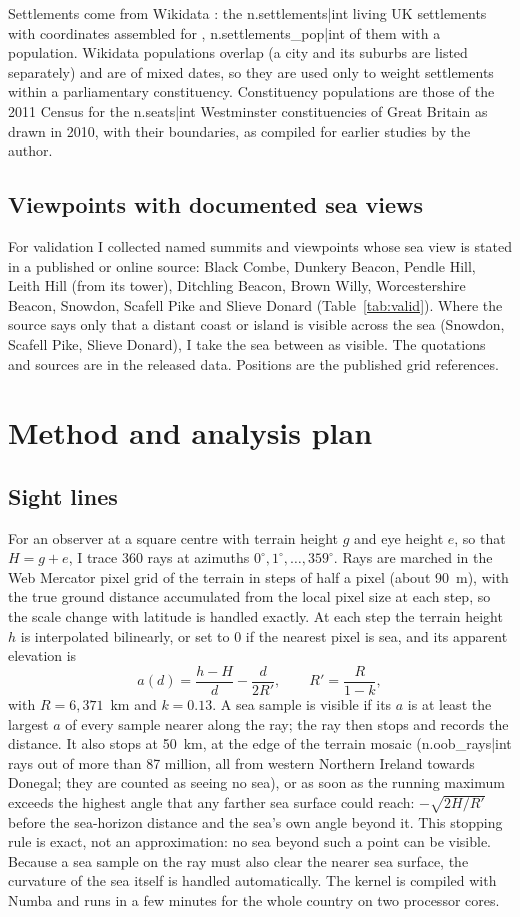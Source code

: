 Settlements come from Wikidata \citep{wikidata}: the {{n.settlements|int}} living UK settlements with coordinates assembled for \citet{hotham2026sunless}, {{n.settlements_pop|int}} of them with a population. Wikidata populations overlap (a city and its suburbs are listed separately) and are of mixed dates, so they are used only to weight settlements within a parliamentary constituency. Constituency populations are those of the 2011 Census for the {{n.seats|int}} Westminster constituencies of Great Britain as drawn in 2010, with their boundaries, as compiled for earlier studies by the author.

\subsection{Viewpoints with documented sea views}
For validation I collected named summits and viewpoints whose sea view is stated in a published or online source: Black Combe, Dunkery Beacon, Pendle Hill, Leith Hill (from its tower), Ditchling Beacon, Brown Willy, Worcestershire Beacon, Snowdon, Scafell Pike and Slieve Donard (Table~\ref{tab:valid}). Where the source says only that a distant coast or island is visible across the sea (Snowdon, Scafell Pike, Slieve Donard), I take the sea between as visible. The quotations and sources are in the released data. Positions are the published grid references.

\section{Method and analysis plan}\label{sec:design}
\subsection{Sight lines}
For an observer at a square centre with terrain height $g$ and eye height $e$, so that $H=g+e$, I trace 360 rays at azimuths $0^\circ, 1^\circ, \dots, 359^\circ$. Rays are marched in the Web Mercator pixel grid of the terrain in steps of half a pixel (about 90~m), with the true ground distance accumulated from the local pixel size at each step, so the scale change with latitude is handled exactly. At each step the terrain height $h$ is interpolated bilinearly, or set to 0 if the nearest pixel is sea, and its apparent elevation is
\[ a(d) = \frac{h-H}{d} - \frac{d}{2R'}, \qquad R' = \frac{R}{1-k}, \]
with $R = 6{,}371$~km and $k = 0.13$. A sea sample is visible if its $a$ is at least the largest $a$ of every sample nearer along the ray; the ray then stops and records the distance. It also stops at 50~km, at the edge of the terrain mosaic ({{n.oob_rays|int}} rays out of more than 87 million, all from western Northern Ireland towards Donegal; they are counted as seeing no sea), or as soon as the running maximum exceeds the highest angle that any farther sea surface could reach: $-\sqrt{2H/R'}$ before the sea-horizon distance and the sea's own angle beyond it. This stopping rule is exact, not an approximation: no sea beyond such a point can be visible. Because a sea sample on the ray must also clear the nearer sea surface, the curvature of the sea itself is handled automatically. The kernel is compiled with Numba and runs in a few minutes for the whole country on two processor cores.

